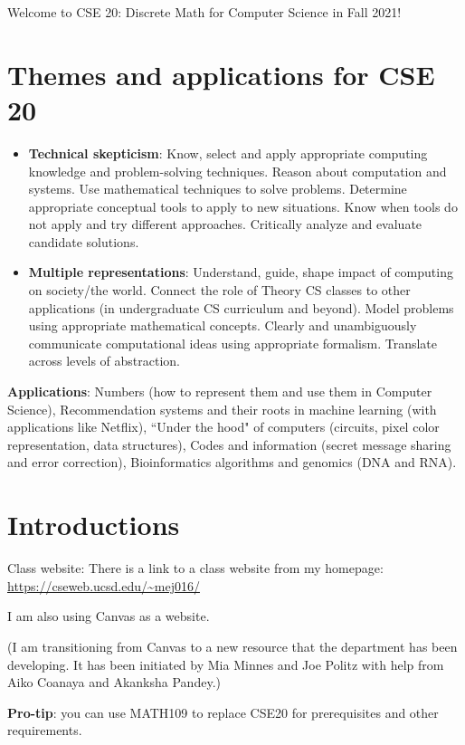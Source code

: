 \documentclass[12pt, oneside]{article}
\begin{document}
\newpage
Welcome to CSE 20: Discrete Math for Computer Science in Fall 2021! 

\section*{Themes and applications for CSE 20}
\begin{itemize}
\item {\bf Technical skepticism}: Know, select and apply appropriate computing knowledge and problem-solving techniques. 
Reason about computation and systems. 
Use mathematical techniques to solve problems. 
Determine appropriate conceptual tools to apply to new situations. 
Know when tools do not apply and try different approaches. 
Critically analyze and evaluate candidate solutions.
\item {\bf Multiple representations}: Understand, guide, shape impact of computing on society/the world. 
Connect the role of Theory CS classes to other applications (in undergraduate CS curriculum and beyond). 
Model problems using appropriate mathematical concepts.
Clearly and unambiguously communicate computational ideas using appropriate formalism. 
Translate across levels of abstraction.
\end{itemize}

{\bf Applications}: Numbers (how to represent them and use them in Computer Science), 
Recommendation systems and their roots in machine learning (with applications like Netflix),
``Under the hood" of computers (circuits, pixel color representation, data structures),
Codes and information (secret message sharing and error correction),
Bioinformatics algorithms and genomics (DNA and RNA).

\section*{Introductions}
Class website: There is a link to a class website from my homepage: \href{https://cseweb.ucsd.edu/~mej016/}{https://cseweb.ucsd.edu/\~{}mej016/}

I am also using Canvas as a website.

(I am transitioning from Canvas to a new resource that the department has been developing. It has been initiated by Mia Minnes and Joe Politz with help from Aiko Coanaya and Akanksha Pandey.)



{\bf Pro-tip}: you can use MATH109 to replace CSE20 for prerequisites and other requirements.
\end{document}
